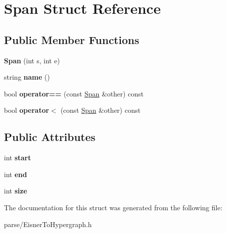 \hypertarget{structSpan}{
\section{Span Struct Reference}
\label{structSpan}
}
\subsection*{Public Member Functions}
\begin{DoxyCompactItemize}
\item 
\hypertarget{structSpan_aa5fb6e25d5c38cd540cc82ca179c82f2}{
{\bfseries Span} (int s, int e)}
\label{structSpan_aa5fb6e25d5c38cd540cc82ca179c82f2}

\item 
\hypertarget{structSpan_af6e7cf8f52e52996cf52bd7d702e9744}{
string {\bfseries name} ()}
\label{structSpan_af6e7cf8f52e52996cf52bd7d702e9744}

\item 
\hypertarget{structSpan_acebe6ab7baeb922c9c69aac317bbcb7a}{
bool {\bfseries operator==} (const \hyperlink{structSpan}{Span} \&other) const }
\label{structSpan_acebe6ab7baeb922c9c69aac317bbcb7a}

\item 
\hypertarget{structSpan_a413ed85231167a494dafeaea71fb4ae0}{
bool {\bfseries operator$<$} (const \hyperlink{structSpan}{Span} \&other) const }
\label{structSpan_a413ed85231167a494dafeaea71fb4ae0}

\end{DoxyCompactItemize}
\subsection*{Public Attributes}
\begin{DoxyCompactItemize}
\item 
\hypertarget{structSpan_a383594a5e203891204e7fa5849b48e78}{
int {\bfseries start}}
\label{structSpan_a383594a5e203891204e7fa5849b48e78}

\item 
\hypertarget{structSpan_ab1d7ba41653ccb2e46cf061c4a476f1d}{
int {\bfseries end}}
\label{structSpan_ab1d7ba41653ccb2e46cf061c4a476f1d}

\item 
\hypertarget{structSpan_a8637010e702d0acf63cdf790ad49c83e}{
int {\bfseries size}}
\label{structSpan_a8637010e702d0acf63cdf790ad49c83e}

\end{DoxyCompactItemize}


The documentation for this struct was generated from the following file:\begin{DoxyCompactItemize}
\item 
parse/EisnerToHypergraph.h\end{DoxyCompactItemize}
